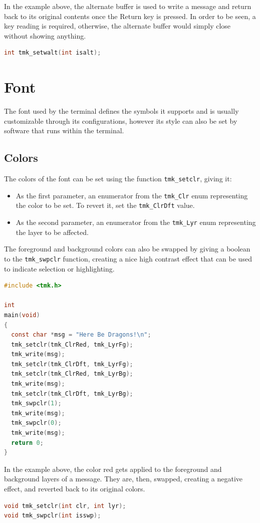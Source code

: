 \documentclass{report}
\begin{document}
In the example above, the alternate buffer is used to write a message and return back to its original contents once the Return key is pressed. In order to be seen, a key reading is required, otherwise, the alternate buffer would simply close without showing anything.
\begin{lstlisting}[language=c,caption=the declaration of the \texttt{tmk\_setwalt} function.]
int tmk_setwalt(int isalt);
\end{lstlisting}
\section{Font}
The font used by the terminal defines the symbols it supports and is usually customizable through its configurations, however its style can also be set by software that runs within the terminal.
\subsection{Colors}
The colors of the font can be set using the function \texttt{tmk\_setclr}, giving it:
\begin{itemize}
  \item As the first parameter, an enumerator from the \texttt{tmk\_Clr} enum representing the color to be set. To revert it, set the \texttt{tmk\_ClrDft} value.
  \item As the second parameter, an enumerator from the \texttt{tmk\_Lyr} enum representing the layer to be affected.
\end{itemize}

The foreground and background colors can also be swapped by giving a boolean to the \texttt{tmk\_swpclr} function, creating a nice high contrast effect that can be used to indicate selection or highlighting.
\begin{lstlisting}[language=c,caption=an example that applies and swaps the colors of a message written.]
#include <tmk.h>

int
main(void)
{
  const char *msg = "Here Be Dragons!\n";
  tmk_setclr(tmk_ClrRed, tmk_LyrFg);
  tmk_write(msg);
  tmk_setclr(tmk_ClrDft, tmk_LyrFg);
  tmk_setclr(tmk_ClrRed, tmk_LyrBg);
  tmk_write(msg);
  tmk_setclr(tmk_ClrDft, tmk_LyrBg);
  tmk_swpclr(1);
  tmk_write(msg);
  tmk_swpclr(0);
  tmk_write(msg);
  return 0;
}
\end{lstlisting}

In the example above, the color red gets applied to the foreground and background layers of a message. They are, then, swapped, creating a negative effect, and reverted back to its original colors.
\begin{lstlisting}[language=c,caption=the declarations of the \texttt{tmk\_setclr} and \texttt{tmk\_swpclr} functions.]
void tmk_setclr(int clr, int lyr);
void tmk_swpclr(int isswp);
\end{lstlisting}
\end{document}
